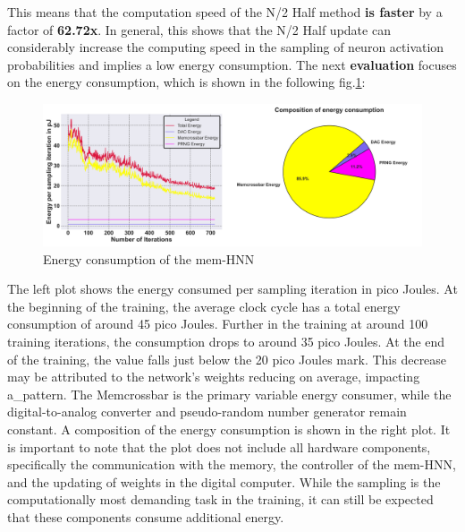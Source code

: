 This means that the computation speed of the N/2 Half method \textbf{is faster} by a factor of \textbf{62.72x}.
In general, this shows that the N/2 Half update can considerably increase the computing speed in the sampling of neuron activation probabilities and
implies a low energy consumption.
The next \textbf{evaluation} focuses on the energy consumption, which is shown in the following fig.\ref{Energy output_2}:
\begin{figure}[H]
    \centering
    \includegraphics[width=0.9\linewidth]{graphics/energy_and_averages_plot_4.png}
    \caption{Energy consumption of the \ac{mem-HNN}}
    \label{Energy output_2}
\end{figure}
The left plot shows the energy consumed per sampling iteration in pico Joules.
At the beginning of the training, the average clock cycle has a total energy consumption of around 45 pico Joules.
Further in the training at around 100 training iterations, the consumption drops to around 35 pico Joules. 
At the end of the training, the value falls just below the 20 pico Joules mark. 
This decrease may be attributed to the network's weights reducing on average, impacting a\_pattern.
The Memcrossbar is the primary variable energy consumer, while the digital-to-analog converter and pseudo-random number generator remain constant. 
A composition of the energy consumption is shown in the right plot.
It is important to note that the plot does not include all hardware components,
specifically the communication with the memory, the controller of the \ac{mem-HNN}, and the updating of weights in the digital computer.
While the sampling is the computationally most demanding task in the training, it can still be expected that these components consume additional energy.

